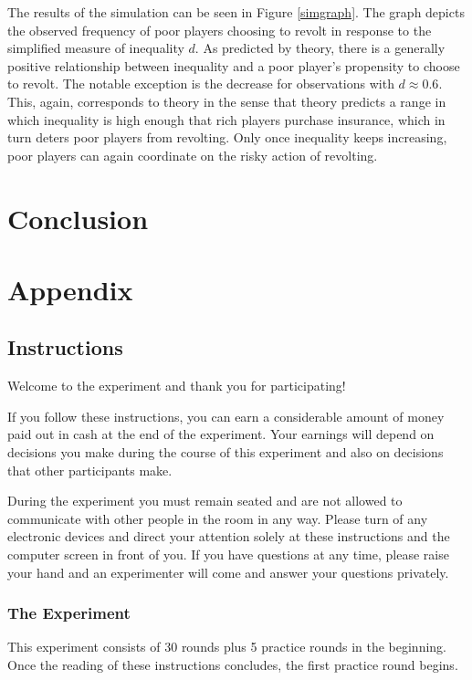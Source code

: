 \documentclass[12pt]{article}
\begin{document}
	The results of the simulation can be seen in Figure \ref{simgraph}. The 
	graph depicts the observed frequency of poor players choosing to revolt in 
	response to the simplified measure of inequality $d$. As predicted by 
	theory, there is a generally positive relationship between inequality and a 
	poor player's propensity to choose to revolt. The notable exception is the 
	decrease for observations with $d\approx0.6$. This, again, corresponds to 
	theory in the sense that theory predicts a range in which inequality is 
	high enough that rich players purchase insurance, which in turn deters poor 
	players from revolting. Only once inequality keeps increasing, poor players 
	can again coordinate on the risky action of revolting.
	
	\section{Conclusion}
	
	\newpage
	\section*{Appendix}
	\subsection*{Instructions}
	Welcome to the experiment and thank you for participating!
	
	If you follow these instructions, you can earn a considerable amount of 
	money paid out in cash at the end of the experiment. Your earnings will 
	depend on decisions you make during the course of this experiment and also 
	on decisions that other participants make.
	
	During the experiment you must remain seated and are not allowed to 
	communicate with other people in the room in any way. Please turn of any 
	electronic devices and direct your attention solely at these instructions 
	and the computer screen in front of you. If you have questions at any time, 
	please raise your hand and an experimenter will come and answer your 
	questions privately.
	
	\subsubsection*{The Experiment}
	This experiment consists of 30 rounds plus 5 practice rounds in the 
	beginning. Once the reading of these instructions concludes, the first 
	practice round begins.
	
\end{document}
